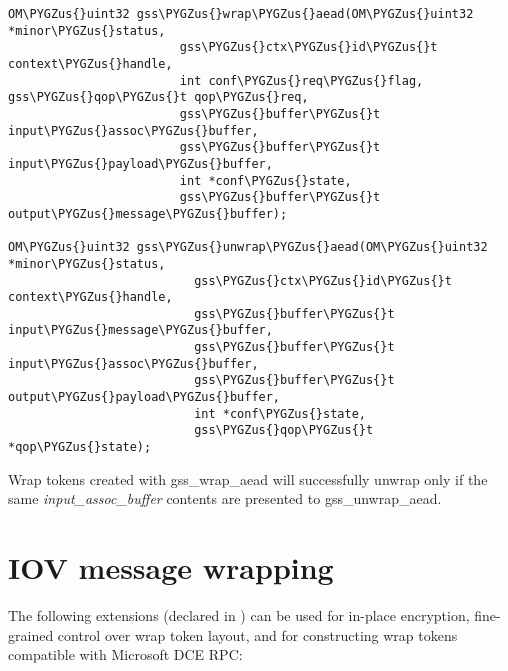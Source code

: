\documentclass[letterpaper,10pt,english]{sphinxmanual}
\def\PYGZus{\char`\_}
\begin{document}
\begin{Verbatim}[commandchars=\\\{\}]
OM\PYGZus{}uint32 gss\PYGZus{}wrap\PYGZus{}aead(OM\PYGZus{}uint32 *minor\PYGZus{}status,
                        gss\PYGZus{}ctx\PYGZus{}id\PYGZus{}t context\PYGZus{}handle,
                        int conf\PYGZus{}req\PYGZus{}flag, gss\PYGZus{}qop\PYGZus{}t qop\PYGZus{}req,
                        gss\PYGZus{}buffer\PYGZus{}t input\PYGZus{}assoc\PYGZus{}buffer,
                        gss\PYGZus{}buffer\PYGZus{}t input\PYGZus{}payload\PYGZus{}buffer,
                        int *conf\PYGZus{}state,
                        gss\PYGZus{}buffer\PYGZus{}t output\PYGZus{}message\PYGZus{}buffer);

OM\PYGZus{}uint32 gss\PYGZus{}unwrap\PYGZus{}aead(OM\PYGZus{}uint32 *minor\PYGZus{}status,
                          gss\PYGZus{}ctx\PYGZus{}id\PYGZus{}t context\PYGZus{}handle,
                          gss\PYGZus{}buffer\PYGZus{}t input\PYGZus{}message\PYGZus{}buffer,
                          gss\PYGZus{}buffer\PYGZus{}t input\PYGZus{}assoc\PYGZus{}buffer,
                          gss\PYGZus{}buffer\PYGZus{}t output\PYGZus{}payload\PYGZus{}buffer,
                          int *conf\PYGZus{}state,
                          gss\PYGZus{}qop\PYGZus{}t *qop\PYGZus{}state);
\end{Verbatim}

Wrap tokens created with gss\_wrap\_aead will successfully unwrap only
if the same \emph{input\_assoc\_buffer} contents are presented to
gss\_unwrap\_aead.


\section{IOV message wrapping}
\label{appdev/gssapi:iov-message-wrapping}
The following extensions (declared in ) can
be used for in-place encryption, fine-grained control over wrap token
layout, and for constructing wrap tokens compatible with Microsoft DCE
RPC:
\end{document}
